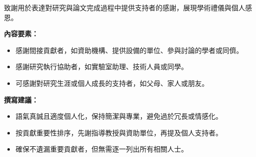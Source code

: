 致謝用於表達對研究與論文完成過程中提供支持者的感謝，展現學術禮儀與個人感恩。

\textbf{內容要素：}
\begin{itemize}
    \item 感謝間接貢獻者，如資助機構、提供設備的單位、參與討論的學者或同儕。
    \item 感謝研究執行協助者，如實驗室助理、技術人員或同學。
   \item 可感謝對研究生涯或個人成長的支持者，如父母、家人或朋友。
\end{itemize}

\bigskip
\textbf{撰寫建議：}
\begin{itemize}
   \item 語氣真誠且適度個人化，保持簡潔與專業，避免過於冗長或情感化。
   \item 按貢獻重要性排序，先謝指導教授與資助單位，再提及個人支持者。
   \item 確保不遺漏重要貢獻者，但無需逐一列出所有相關人士。

\end{itemize}


